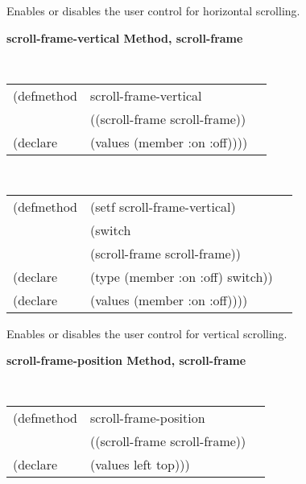 \begin{flushright} \parbox[t]{6.125in}{
Enables or disables the user control for horizontal scrolling. 
}\end{flushright}


{\samepage
{\large {\bf scroll-frame-vertical \hfill Method, scroll-frame}}
\begin{flushright} \parbox[t]{6.125in}{
\tt
\begin{tabular}{lll}
\raggedright
(defmethod & scroll-frame-vertical & \\
& ((scroll-frame  scroll-frame)) \\
(declare & (values (member :on :off))))
\end{tabular}
\rm

}\end{flushright}}

{\samepage
\begin{flushright} \parbox[t]{6.125in}{
\tt
\begin{tabular}{lll}
\raggedright
(defmethod & (setf scroll-frame-vertical) & \\
         & (switch \\
         & (scroll-frame scroll-frame)) \\
(declare &(type (member :on :off)  switch))\\
(declare & (values (member :on :off))))
\end{tabular}
\rm
}
\end{flushright}}


\begin{flushright} \parbox[t]{6.125in}{
Enables or disables the user control for vertical scrolling. 
}\end{flushright}



{\samepage
{\large {\bf scroll-frame-position \hfill Method, scroll-frame}}
\begin{flushright} \parbox[t]{6.125in}{
\tt
\begin{tabular}{lll}
\raggedright
(defmethod & scroll-frame-position & \\
& ((scroll-frame  scroll-frame)) \\
(declare & (values left top)))
\end{tabular}
\rm

}\end{flushright}}

